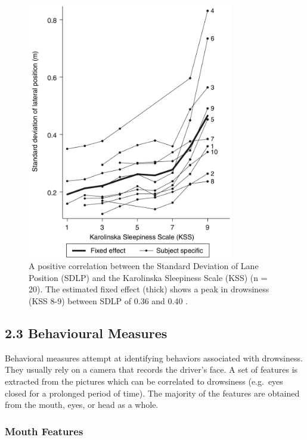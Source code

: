 \documentclass[12pt]{extarticle}
\begin{document}
\begin{figure}
    \centering
    \includegraphics[width=0.8\textwidth]{img/lane_position.png}
    \caption{A positive correlation between the Standard
Deviation of Lane Position (SDLP) and the Karolinska Sleepiness Scale
(KSS) (n = 20). The estimated fixed effect (thick) shows a peak in
drowsiness (KSS 8-9) between SDLP of 0.36 and 0.40 \cite{ingre_subjective_2006}. }
    \label{fig:lane_position}
\end{figure}

\newpage
\hypertarget{behavioural-measures}{%
\subsection{2.3 Behavioural Measures}\label{behavioural-measures}}

Behavioral measures attempt at identifying behaviors associated with
drowsiness. They usually rely on a camera that records the driver's
face. A set of features is extracted from the pictures which can be
correlated to drowsiness (e.g.~eyes closed for a prolonged period of
time). The majority of the features are obtained from the mouth, eyes,
or head as a whole.

\hypertarget{mouth-features}{%
\subsubsection{Mouth Features}\label{mouth-features}}
\end{document}
